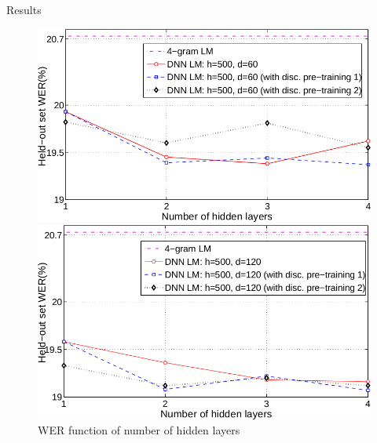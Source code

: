 \documentclass{beamer}
\begin{document}
\begin{frame}{Results}
	\begin{figure}[!htb]
		\centering
			\begin{minipage}{0.45\textwidth}
				    \includegraphics[width=\linewidth]{./images/results4.png}
			\end{minipage}
			\hspace{5mm}
			\begin{minipage}{0.45\textwidth}
				    \includegraphics[width=\linewidth]{./images/results5.png}
			\end{minipage}
		\caption{WER function of number of hidden layers}
	\end{figure}
\end{frame}
\end{document}
